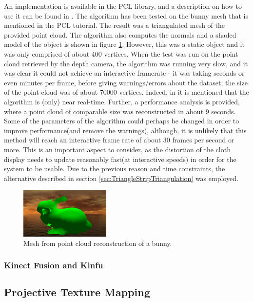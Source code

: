 \documentclass[]{article}
\begin{document}
An implementation is available in the PCL library, and a description on how to use it can be found in \cite{PCLGreedy}. The algorithm has been tested on the bunny mesh that is mentioned in the PCL tutorial. The result was a triangulated mesh of the provided point cloud. The algorithm also computes the normals and a shaded model of the object is shown in figure \ref{fig:ReconstructedBunny}. However, this was a static object and it was only comprised of about 400 vertices. When the test was run on the point cloud retrieved by the depth camera, the algorithm was running very slow, and it was clear it could not achieve an interactive framerate - it was taking seconds or even minutes per frame, before giving warnings/errors about the dataset; the size of the point cloud was of about 70000 vertices. Indeed, in \cite{Marton09ICRA} it is mentioned that the algorithm is (only) near real-time. Further, a performance analysis is provided, where a point cloud of comparable size was reconstructed in about 9 seconds. Some of the parameters of the algorithm could perhaps be changed in order to improve performance(and remove the warnings), although, it is unlikely that this method will reach an interactive frame rate of about 30 frames per second or more. This is an important aspect to consider, as the distortion of the cloth display needs to update reasonably fast(at interactive speeds) in order for the system to be usable. Due to the previous reason and time constraints, the alternative described in section  \ref{sec:TriangleStripTriangulation} was employed.
 
\begin{figure}[hbtp]
    \centering
    \includegraphics[width=0.4\textwidth]{figures/reconstructedBunny.png}
    \caption{Mesh from point cloud reconstruction of a bunny.}
    \label{fig:ReconstructedBunny}
\end{figure}


\subsubsection{Kinect Fusion and Kinfu}

\subsection{Projective Texture Mapping}
\label{sec:ptm}
\end{document}
